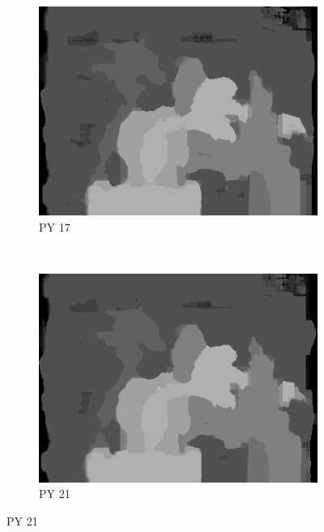 \begin{figure}
\begin{subfigure}[b]{0.23\textwidth}
    \includegraphics[width=\textwidth]{images/stereo-pairs/tsukuba_pyramid_17.png}
    \caption{PY 17}
  \end{subfigure}
  ~
  \begin{subfigure}[b]{0.23\textwidth}
    \centering
    \includegraphics[width=\textwidth]{images/stereo-pairs/tsukuba_pyramid_21.png}
    \caption{PY 21}
  \end{subfigure}


\end{figure}
